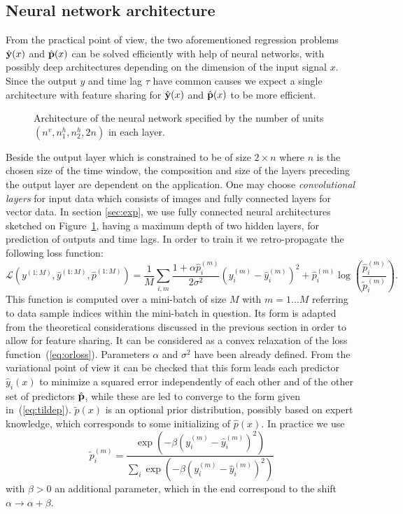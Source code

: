 \documentclass[envcountsect,runningheads]{llncs}
\theoremstyle{etoile}
\begin{document}
\subsection{Neural network architecture}
From the practical point of view, the two aforementioned regression problems $\hat {\bf y}(x)$ and $\hat {\bf p}(x)$ can be solved efficiently with help of neural networks, with possibly deep
architectures depending on the dimension of the input signal $x$. Since the output $y$ and time lag $\tau$ have common causes we expect a single architecture with feature sharing
for $\hat {\bf y}(x)$ and $\hat {\bf p}(x)$ to be more efficient.
\begin{figure}[ht]
\centerline{\resizebox*{0.7\textwidth}{!}{}}
\caption{\label{fig:archi} Architecture of the neural network specified by the number of units $(n^v,n_1^h,n_2^h,2n)$ in each layer.}
\end{figure}
Beside the output layer which is constrained to be of size $2 \times n$ where $n$ is the chosen size of the time window,
the composition and size of the layers preceding the output layer are dependent on the application. 
One may choose \emph{convolutional layers} for input data which consists of images and fully connected 
layers for vector data.
In section \ref{sec:exp}, we use fully connected neural architectures sketched on Figure~\ref{fig:archi}, having a maximum depth of 
two hidden layers, for prediction of outputs and time lags. 
In order to train it we retro-propagate the following loss function:
\begin{equation}
\mathcal{L}(y^{(1:M)}, \hat{y}^{(1:M)}, \hat{p}^{(1:M)}) =
 \frac{1}{M}\sum_{i,m} \frac{1 + \alpha \hat{p}^{(m)}_i}{2\sigma^2}(y^{(m)}_{i} - \hat{y}^{(m)}_{i})^2   
+  \hat{p}^{(m)}_{i}\log \left (\frac{\hat{p}^{(m)}_i}{\tilde{p}^{(m)}_i} \right).\label{eq:loss}
\end{equation}
This function is computed over a mini-batch of size $M$ with $m=1\ldots M$ referring  to data sample indices within the
mini-batch in question. Its form is  adapted from the theoretical considerations discussed in the previous section in order to allow for feature sharing.
It can be considered as a convex relaxation of the loss function~(\ref{eq:orloss}). 
Parameters $\alpha$ and $\sigma^2$ have been already defined. From the variational point of view it can be checked that this form leads
each predictor $\hat y_i(x)$ to minimize a squared error independently of each other and of the other set of predictors $\hat {\bf p}$, while these are led to converge
to the form given in~(\ref{eq:tildep}).
$\tilde p(x)$ is an optional prior distribution, possibly based on expert knowledge, which corresponds to some initializing of $\hat p(x)$. 
In practice we use
\begin{equation}\label{eq:targetprob}
\widetilde{p}_{i}^{(m)} = \frac{\exp \left(- \beta (y_{i}^{(m)} - \hat{y}_{i}^{(m)})^{2} \right)}
{\sum_{i}{\exp \left(- \beta (y_{i}^{(m)} - \hat{y}_{i}^{(m)})^{2} \right)}} 
\end{equation}
with $\beta>0$ an additional parameter, which in the end correspond to the  shift $\alpha\to\alpha+\beta$.
\end{document}
